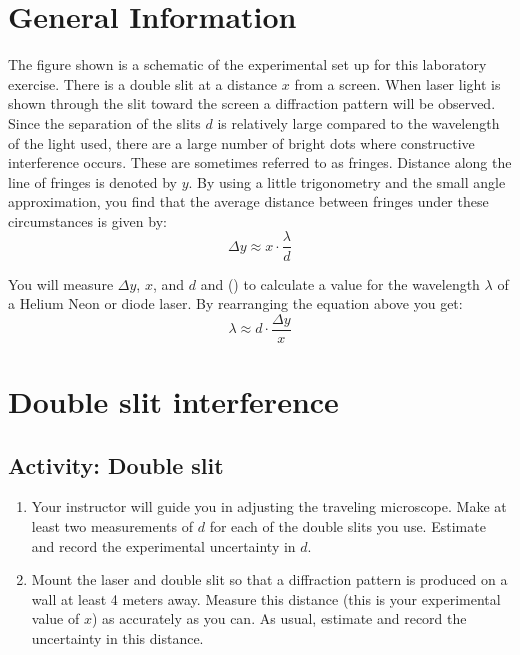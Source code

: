 \begin{multicols}{2}
\section{General Information}
The figure shown is a schematic of the experimental set up for this laboratory exercise. There is a double slit at a distance $x$ from a screen.  When laser light is shown through the slit toward the screen a diffraction pattern will be observed.  Since the separation of the slits $d$ is relatively large compared to the wavelength  of the light used, there are a large number of bright dots where constructive interference occurs.  These are sometimes referred to as fringes.  Distance along the line of fringes is denoted by $y$. By using a little trigonometry and the small angle approximation, you find that the average distance between fringes under these circumstances is given by: 
\begin{equation} \label{e:deltay}
	\Delta y \approx x  \cdot \frac{\lambda}{d}
\end{equation}

You will measure $\Delta y$, $x$, and $d$ and () to calculate a value for the wavelength $\lambda$ of a Helium Neon or diode laser. By rearranging the equation above you get:
\begin{equation} \label{e:lambda}
	\lambda \approx d \cdot \frac{\Delta y}{x}
\end{equation}

\section {Double slit interference}

\subsection{Activity: Double slit}
\begin{enumerate}
	\item Your instructor will guide you in adjusting the traveling microscope.  Make at least two measurements of $d$ for each of the double slits you use.  Estimate and record the experimental uncertainty in $d$.
	\item 	Mount the laser and double slit so that a diffraction pattern is produced on a wall at least 4 meters away.  Measure this distance (this is your experimental value of $x$) as accurately as you can.  As usual, estimate and record the uncertainty in this distance.
\end{enumerate}


\end{multicols}
